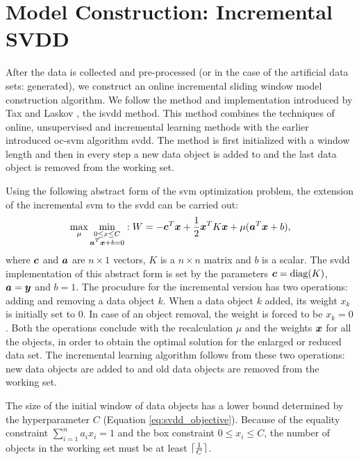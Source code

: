 \section{Model Construction: Incremental SVDD}\label{sec:method_model_construction}
After the data is collected and pre-processed (or in the case of the artificial data sets: generated), we construct an online incremental sliding window model construction algorithm.
We follow the method and implementation introduced by Tax and Laskov \cite{tax2003online}, the \acrlong{isvdd} method.
This method combines the techniques of online, unsupervised and incremental learning methods with the earlier introduced \gls{oc-svm} algorithm \gls{svdd}.
The method is first initialized with a window length and then in every step a new data object is added to and the last data object is removed from the working set.

Using the following abstract form of the \gls{svm} optimization problem, the extension of the incremental \gls{svm} to the \gls{svdd} can be carried out:
\begin{equation}
  \operatorname*{max}_\mu \operatorname*{min}_{\substack{
    0 \le x \le C \\
    \vectorsym{a}^T \vectorsym{x} + b = 0}
  } : W = -\vectorsym{c}^T\vectorsym{x} + \frac{1}{2}\vectorsym{x}^T K\vectorsym{x} + \mu(\vectorsym{a}^T\vectorsym{x} + b),
\end{equation}
where $\vectorsym{c}$ and $\vectorsym{a}$ are $n \times 1$ vectors, $K$ is a $n \times n$ matrix and $b$ is a scalar.
The \gls{svdd} implementation of this abstract form is set by the parameters $\vectorsym{c}=\operatorname*{diag}(K)$, $\vectorsym{a} = \vectorsym{y}$ and $b=1$.
The procudure for the incremental version has two operations: adding and removing a data object $k$.
When a data object $k$ added, its weight $x_k$ is initially set to $0$.
In case of an object removal, the weight is forced to be $x_k=0$.
Both the operations conclude with the recalculation $\mu$ and the weights $\vectorsym{x}$ for all the objects, in order to obtain the optimal solution for the enlarged or reduced data set.
The incremental learning algorithm follows from these two operations: new data objects are added to and old data objects are removed from the working set.

The size of the initial window of data objects has a lower bound determined by the hyperparameter $C$ (Equation \ref{eq:svdd_objective}).
Because of the equality constraint $\sum_{i=1}^n a_i x_i = 1$ and the box constraint $0 \le x_i \le C$, the number of objects in the working set must be at least $\lceil\frac{1}{C}\rceil$.

